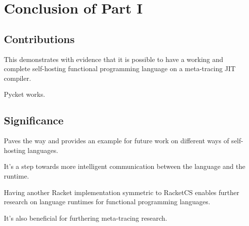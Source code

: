 \chapter{Conclusion of Part I}

	\section{Contributions}
		\begin{mainpoint}
			This demonstrates with evidence that it is possible to have a
			working and complete self-hosting functional programming language
			on a meta-tracing JIT compiler.
		\end{mainpoint}

		\begin{paragraph-here}
			Pycket works.
		\end{paragraph-here}


	\section{Significance}
		\begin{mainpoint}
			Paves the way and provides an example for future work on
			different ways of self-hosting languages.

			It's a step towards more intelligent communication between
			the language and the runtime.

			Having another Racket implementation symmetric to RacketCS
			enables further research on language runtimes for functional
			programming languages.

			It's also beneficial for furthering meta-tracing research.
		\end{mainpoint}